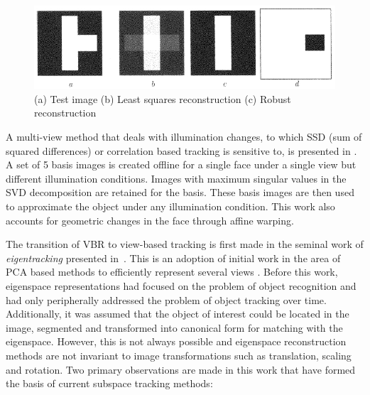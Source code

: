 								\begin{figure}
								\center
								\includegraphics[width=1.0\textwidth]{thesis/TrackingPapers_SubspaceTracking_1998_Black_fig3_nocaption.png}
								\caption{(a) Test image (b) Least squares reconstruction (c) Robust reconstruction \cite{1998_JNL_Eigentracking_Black}}
								\end{figure}

A multi-view method that deals with illumination changes, to which SSD (sum of squared differences) or correlation based tracking is sensitive to, is presented in \cite{1996_TRK_region_Hager}.  A set of 5 basis images is created offline for a single face under a single view but different illumination conditions.  Images with maximum singular values in the SVD decomposition are retained for the basis.  These basis images are then used to approximate the object under any illumination condition.  This work also accounts for geometric changes in the face through affine warping.  

The transition of VBR to view-based tracking is first made in the seminal work of \emph{eigentracking} presented in~\cite{1998_JNL_Eigentracking_Black}.  This is an adoption of initial work in the area of PCA based methods to efficiently represent several views \cite{1995_JNL_ActiveModels_Cootes, 1991_CNF_Eigenfaces_Turk}.  Before this work, eigenspace representations had focused on the problem of object recognition and had only peripherally addressed the problem of object tracking over time.  Additionally, it was assumed that the object of interest could be located in the image, segmented and transformed into canonical form for matching with the eigenspace.  However, this is not always possible and eigenspace reconstruction methods are not invariant to image transformations such as translation, scaling and rotation.  Two primary observations are made in this work that have formed the basis of current subspace tracking methods:

